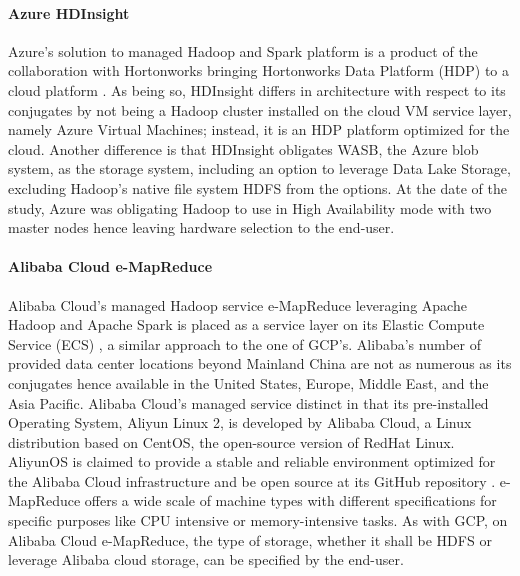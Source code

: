 \documentclass[review]{elsarticle}
\begin{document}
\paragraph{Azure HDInsight \cite{noauthor_azure_nodate}}Azure's solution to managed Hadoop and Spark platform is a product of the collaboration with Hortonworks bringing Hortonworks Data Platform (HDP) to a cloud platform \cite{noauthor_azuravail_nodate}. As being so, HDInsight differs in architecture with respect to its conjugates by not being a Hadoop cluster installed on the cloud VM service layer, namely Azure Virtual Machines; instead, it is an HDP platform optimized for the cloud. Another difference is that HDInsight obligates WASB, the Azure blob system, as the storage system, including an option to leverage Data Lake Storage, excluding Hadoop's native file system HDFS from the options. At the date of the study, Azure was obligating Hadoop to use in High Availability mode with two master nodes hence leaving hardware selection to the end-user.

\paragraph{Alibaba Cloud e-MapReduce \cite{noauthor_what_nodate}}Alibaba Cloud's managed Hadoop service e-MapReduce leveraging Apache Hadoop and Apache Spark is placed as a service layer on its Elastic Compute Service (ECS) \cite{noauthor_alielastic_nodate}, a similar approach to the one of GCP's. Alibaba's number of provided data center locations beyond Mainland China are not as numerous as its conjugates hence available in the United States, Europe, Middle East, and the Asia Pacific. Alibaba Cloud's managed service distinct in that its pre-installed Operating System, Aliyun Linux 2, is developed by Alibaba Cloud, a Linux distribution based on CentOS, the open-source version of RedHat Linux. AliyunOS is claimed to provide a stable and reliable environment optimized for the Alibaba Cloud infrastructure and be open source at its GitHub repository \cite{noauthor_alibaba_nodate}. e-MapReduce offers a wide scale of machine types with different specifications for specific purposes like CPU intensive or memory-intensive tasks. As with GCP, on Alibaba Cloud e-MapReduce, the type of storage, whether it shall be HDFS or leverage Alibaba cloud storage, can be specified by the end-user.
\end{document}
